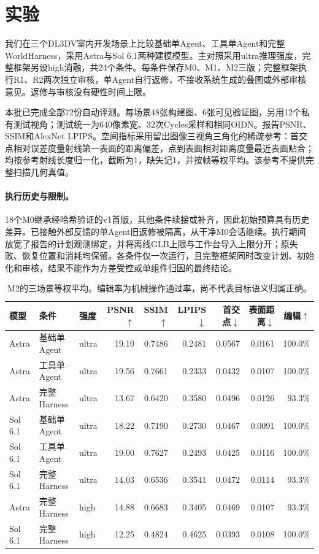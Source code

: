 \section{实验}
我们在三个DL3DV室内开发场景上比较基础单Agent、工具单Agent和完整WorldHarness，采用Astra与Sol 6.1两种建模模型。主对照采用ultra推理强度，完整框架另设high消融，共24个条件。每条件保存M0、M1、M2三版；完整框架执行R1、R2两次独立审核，单Agent自行返修，不接收系统生成的叠图或外部审核意见。返修与审核没有硬性时间上限。

本批已完成全部72份自动评测。每场景48张构建图、6张可见验证图，另用12个私有测试视角；测试统一为640像素宽、32次Cycles采样和相同OIDN。报告PSNR、SSIM和AlexNet LPIPS。空间指标采用留出图像三视角三角化的稀疏参考：首交点相对误差度量射线第一表面的距离偏差，点到表面相对距离度量最近表面贴合；均按参考射线长度归一化，截断为1，缺失记1，并按帧等权平均。该参考不提供完整扫描几何真值。

\paragraph{执行历史与限制。}
18个M0继承经哈希验证的v1首版，其他条件续接或补齐，因此初始预算具有历史差异。已接触外部反馈的单Agent旧返修被隔离，从干净M0会话继续。执行期间放宽了报告的计划观测绑定，并将离线GLB上限与工作台导入上限分开；原失败、恢复位置和消耗均保留。各条件仅一次运行，且完整框架同时改变计划、初始化和审核，结果不能作为方差受控或单组件归因的最终结论。

\begin{table}[t]
\centering
\caption{M2的三场景等权平均。编辑率为机械操作通过率，尚不代表目标语义归属正确。}
\begin{tabular}{lllrrrrrr}
\hline
模型 & 条件 & 强度 & PSNR$\uparrow$ & SSIM$\uparrow$ & LPIPS$\downarrow$ & 首交点$\downarrow$ & 表面距离$\downarrow$ & 编辑$\uparrow$ \\
\hline
Astra & 基础单Agent & ultra & 19.10 & 0.7486 & 0.2481 & 0.0567 & 0.0161 & 100.0\% \\
Astra & 工具单Agent & ultra & 19.56 & 0.7661 & 0.2333 & 0.0432 & 0.0107 & 100.0\% \\
Astra & 完整Harness & ultra & 13.67 & 0.6420 & 0.3580 & 0.0496 & 0.0126 & 93.3\% \\
Sol 6.1 & 基础单Agent & ultra & 18.22 & 0.7190 & 0.2730 & 0.0467 & 0.0091 & 100.0\% \\
Sol 6.1 & 工具单Agent & ultra & 19.00 & 0.7627 & 0.2493 & 0.0425 & 0.0116 & 100.0\% \\
Sol 6.1 & 完整Harness & ultra & 14.03 & 0.6536 & 0.3541 & 0.0472 & 0.0114 & 93.3\% \\
Astra & 完整Harness & high & 14.88 & 0.6683 & 0.3405 & 0.0469 & 0.0107 & 93.3\% \\
Sol 6.1 & 完整Harness & high & 12.25 & 0.4824 & 0.4625 & 0.0393 & 0.0108 & 100.0\% \\
\hline
\end{tabular}
\end{table}

